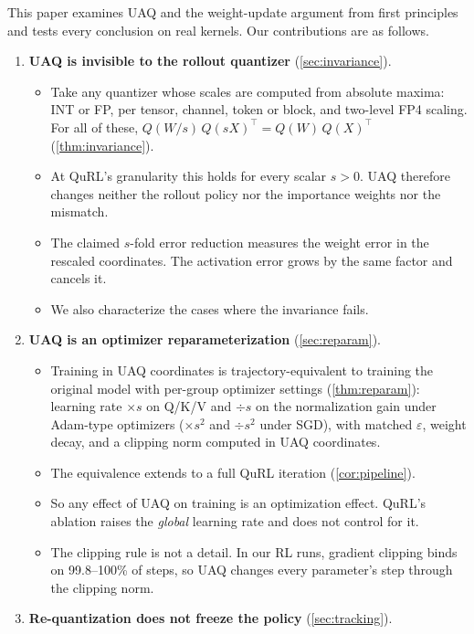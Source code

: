 This paper examines UAQ and the weight-update argument from first principles and tests every conclusion on real kernels. Our contributions are as follows.
\begin{enumerate}[leftmargin=*,itemsep=2pt]
\item \textbf{UAQ is invisible to the rollout quantizer} (\cref{sec:invariance}).
  \begin{itemize}[leftmargin=*,itemsep=1pt]
  \item Take any quantizer whose scales are computed from absolute maxima: INT or FP, per tensor, channel, token or block, and two-level FP4 scaling. For all of these, $Q(W/s)\,Q(sX)^\top=Q(W)\,Q(X)^\top$ (\cref{thm:invariance}).
  \item At QuRL's granularity this holds for every scalar $s>0$. UAQ therefore changes neither the rollout policy nor the importance weights nor the mismatch.
  \item The claimed $s$-fold error reduction measures the weight error in the rescaled coordinates. The activation error grows by the same factor and cancels it.
  \item We also characterize the cases where the invariance fails.
  \end{itemize}
\item \textbf{UAQ is an optimizer reparameterization} (\cref{sec:reparam}).
  \begin{itemize}[leftmargin=*,itemsep=1pt]
  \item Training in UAQ coordinates is trajectory-equivalent to training the original model with per-group optimizer settings (\cref{thm:reparam}): learning rate $\times s$ on Q/K/V and $\div s$ on the normalization gain under Adam-type optimizers ($\times s^2$ and $\div s^2$ under SGD), with matched $\varepsilon$, weight decay, and a clipping norm computed in UAQ coordinates.
  \item The equivalence extends to a full QuRL iteration (\cref{cor:pipeline}).
  \item So any effect of UAQ on training is an optimization effect. QuRL's ablation raises the \emph{global} learning rate and does not control for it.
  \item The clipping rule is not a detail. In our RL runs, gradient clipping binds on 99.8--100\% of steps, so UAQ changes every parameter's step through the clipping norm.
  \end{itemize}
\item \textbf{Re-quantization does not freeze the policy} (\cref{sec:tracking}).

\end{enumerate}
